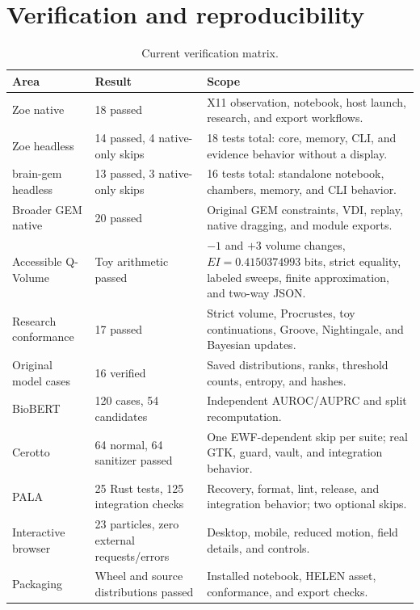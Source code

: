 \documentclass[11pt,a4paper]{article}
\begin{document}
\section{Verification and reproducibility}
\begin{table}[htbp]
\centering
\caption{Current verification matrix.}
\small
\begin{tabular}{p{4.2cm}p{3cm}p{7cm}}
\toprule
Area & Result & Scope \\
\midrule
Zoe native & 18 passed & X11 observation, notebook, host launch, research, and export workflows. \\
Zoe headless & 14 passed, 4 native-only skips & 18 tests total: core, memory, CLI, and evidence behavior without a display. \\
brain-gem headless & 13 passed, 3 native-only skips & 16 tests total: standalone notebook, chambers, memory, and CLI behavior. \\
Broader GEM native & 20 passed & Original GEM constraints, VDI, replay, native dragging, and module exports. \\
Accessible Q-Volume & Toy arithmetic passed & $-1$ and $+3$ volume changes, $EI=0.4150374993$ bits, strict equality, labeled sweeps, finite approximation, and two-way JSON. \\
Research conformance & 17 passed & Strict volume, Procrustes, toy continuations, Groove, Nightingale, and Bayesian updates. \\
Original model cases & 16 verified & Saved distributions, ranks, threshold counts, entropy, and hashes. \\
BioBERT & 120 cases, 54 candidates & Independent AUROC/AUPRC and split recomputation. \\
Cerotto & 64 normal, 64 sanitizer passed & One EWF-dependent skip per suite; real GTK, guard, vault, and integration behavior. \\
PALA & 25 Rust tests, 125 integration checks & Recovery, format, lint, release, and integration behavior; two optional skips. \\
Interactive browser & 23 particles, zero external requests/errors & Desktop, mobile, reduced motion, field details, and controls. \\
Packaging & Wheel and source distributions passed & Installed notebook, HELEN asset, conformance, and export checks. \\
\bottomrule
\end{tabular}
\end{table}
\end{document}
